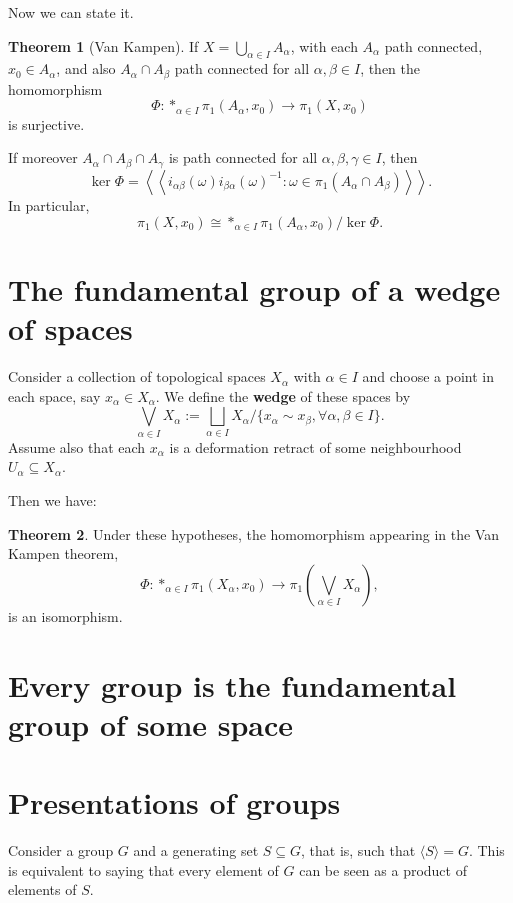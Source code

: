 \documentclass{book}
\theoremstyle{definition}
\newtheorem*{teo}{Theorem}
\begin{document}
Now we can state it.

\begin{teo}[Van Kampen]
If $X=\bigcup_{\alpha\in I}A_\alpha$, with each $A_\alpha$
path connected, $x_0\in A_\alpha$, and also
$A_\alpha\cap A_\beta$ path connected for all
$\alpha,\beta\in I$, then the homomorphism
$$
\Phi:\ast_{\alpha\in I}\pi_1(A_\alpha,x_0)
\to\pi_1(X,x_0)
$$
is surjective.

If moreover $A_\alpha\cap A_\beta\cap A_\gamma$ is path
connected for all $\alpha,\beta,\gamma\in I$, then
$$
\ker\Phi=
\left\langle\left\langle
 i_{\alpha\beta}(\omega)i_{\beta\alpha}(\omega)^{-1}
 :\omega\in\pi_1(A_\alpha\cap A_\beta)
\right\rangle\right\rangle.
$$
In particular,
$$
\pi_1(X,x_0)\cong
\ast_{\alpha\in I}\pi_1(A_\alpha,x_0)/\ker\Phi.
$$
\end{teo}

\section{The fundamental group of a wedge of spaces}
\label{sec:grp-fund-cuña}

Consider a collection of topological spaces $X_\alpha$ with
$\alpha\in I$ and choose a point in each space, say
$x_\alpha\in X_\alpha$. We define the \textbf{wedge} of these
spaces by
$$
\bigvee_{\alpha\in I}X_\alpha
:=
\bigsqcup_{\alpha\in I}X_\alpha
\Big/\{x_\alpha\sim{}x_\beta,\forall\alpha,\beta\in I\}.
$$
Assume also that each $x_\alpha$ is a deformation retract
of some neighbourhood $U_\alpha\subseteq X_\alpha$.

Then we have:

\begin{teo}
Under these hypotheses, the homomorphism appearing in the
Van Kampen theorem,
$$
\Phi:\ast_{\alpha\in I}\pi_1(X_\alpha,x_0)
\to
\pi_1\left(\bigvee_{\alpha\in I}X_\alpha\right),
$$
is an isomorphism.
\end{teo}

\section{Every group is the fundamental group of some space}

\section{Presentations of groups}

Consider a group $G$ and a generating set $S\subseteq G$,
that is, such that $\langle S\rangle=G$. This is equivalent
to saying that every element of $G$ can be seen as a product
of elements of $S$.
\end{document}
